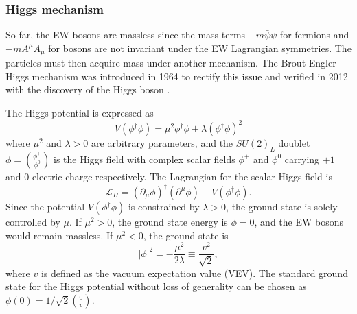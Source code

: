 \documentclass[../thesis.tex]{subfiles}
\begin{document}
\subsubsection{Higgs mechanism}
\label{sec:higgs}
So far, the \acs{EW} bosons are massless since the mass terms $-m\bar{\psi}\psi$ for fermions and $-mA^\mu A_\mu$ for bosons are not invariant under the \acs{EW} Lagrangian symmetries. The particles must then acquire mass under another mechanism. The Brout-Engler-Higgs mechanism \citep{theory:higgs1,theory:higgs2,theory:brout_englert} was introduced in 1964 to rectify this issue and verified in 2012 with the discovery of the Higgs boson \citep{theory:higgs_atlas,theory:higgs_cms}.

The Higgs potential is expressed as
\begin{equation}
V(\phi^\dagger\phi) = \mu^2\phi^\dagger\phi+\lambda(\phi^\dagger\phi)^2
\end{equation}
where $\mu^2$ and $\lambda>0$ are arbitrary parameters, and the $SU(2)_L$ doublet $\phi=\binom{\phi^+}{\phi^0}$ is the Higgs field with complex scalar fields $\phi^+$ and $\phi^0$ carrying $+1$ and $0$ electric charge respectively. The Lagrangian for the scalar Higgs field is
\begin{equation}
\mathcal{L}_H = \left(\partial_\mu \phi\right)^\dagger \left(\partial^\mu \phi\right) - V\left(\phi^\dagger\phi\right).
\end{equation}
Since the potential $V(\phi^\dagger\phi)$ is constrained by $\lambda>0$, the ground state is solely controlled by $\mu$. If $\mu^2>0$, the ground state energy is $\phi=0$, and the \acs{EW} bosons would remain massless. If $\mu^2<0$, the ground state is
\begin{equation}
|\phi|^2 = -\displaystyle\frac{\mu^2}{2\lambda} \equiv \displaystyle\frac{v^2}{\sqrt{2}},
\end{equation}
where $v$ is defined as the vacuum expectation value (\acs{VEV}). The standard ground state for the Higgs potential without loss of generality can be chosen as $\phi(0) = 1/\sqrt{2}\binom{0}{v}$.
\end{document}
